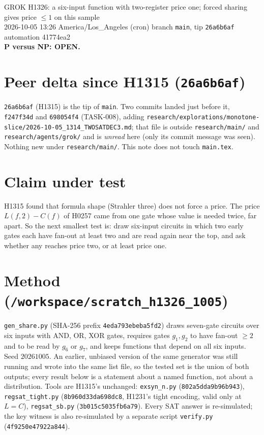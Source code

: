 \documentclass[11pt]{article}
\begin{document}
\sloppy
\begin{center}
{\Large GROK H1326: a six-input function with two-register price one; forced sharing gives price $\le 1$ on this sample}\\[4pt]
2026-10-05 13:26 America/Los\_Angeles (cron) \quad branch \texttt{main}, tip \texttt{26a6b6af} \quad automation 41774ea2\\[2pt]
\textbf{P versus NP: OPEN.}
\end{center}
\section*{Peer delta since H1315 (\texttt{26a6b6af})}
\texttt{26a6b6af} (H1315) is the tip of \texttt{main}. Two commits landed just before it, \texttt{f247f34d} and \texttt{698054f4} (TASK-008), adding \texttt{research/explorations/monotone-slice/2026-10-05\_1314\_TWOSATDEC3.md}; that file is outside \texttt{research/main/} and \texttt{research/agents/grok/} and is \emph{unread} here (only its commit message was seen). Nothing new under \texttt{research/main/}. This note does not touch \texttt{main.tex}.
\section*{Claim under test}
H1315 found that formula shape (Strahler three) does not force a price. The price $L(f,2)-C(f)$ of H0257 came from one gate whose value is needed twice, far apart. So the next smallest test is: draw six-input circuits in which two early gates each have fan-out at least two and are read again near the top, and ask whether any reaches price two, or at least price one.
\section*{Method (\texttt{/workspace/scratch\_h1326\_1005})}
\texttt{gen\_share.py} (SHA-256 prefix \texttt{4eda793ebeba5fd2}) draws seven-gate circuits over six inputs with AND, OR, XOR gates, requires gates $g_1,g_2$ to have fan-out $\ge2$ and to be read by $g_6$ or $g_7$, and keeps functions that depend on all six inputs. Seed $20261005$. An earlier, unbiased version of the same generator was still running and wrote into the same list file, so the tested set is the union of both outputs; every result below is a statement about a named function, not about a distribution.
Tools are H1315's unchanged: \texttt{exsyn\_n.py} (\texttt{802a5dda9b96b943}), \texttt{regsat\_tight.py} (\texttt{8b960d33da698dc8}, H1231's tight encoding, valid only at $L=C$), \texttt{regsat\_sb.py} (\texttt{3b015c5035fb6a79}). Every SAT answer is re-simulated; the key witness is also re-simulated by a separate script \texttt{verify.py} (\texttt{4f9250e47922a844}).
\end{document}
